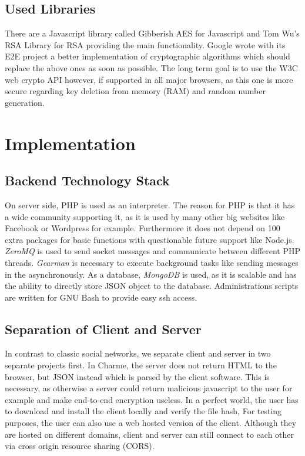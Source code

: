 \documentclass{scrartcl}
\begin{document}
\subsection{Used Libraries}
There are a Javascript library called Gibberish AES for Javascript and Tom Wu's RSA Library for RSA providing the main functionality. Google wrote with its E2E project a better implementation of cryptographic algorithms which should replace the above ones as soon as possible. The long term goal is to use the W3C web crypto API however, if supported in all major browsers, as this one is more secure regarding key deletion from memory (RAM) and random number generation. 

\newpage
\section{Implementation}
\subsection{Backend Technology Stack}
On server side, PHP is used as an interpreter. The reason for PHP is that it has a wide community supporting it, as it is used by many other big websites like Facebook or Wordpress for example. Furthermore it does not depend on 100 extra packages for basic functions with questionable future support like Node.js.
 \textit{ZeroMQ} is used to send socket messages and communicate between different PHP threads. \textit{Gearman} is necessary to execute background tasks like sending messages in the asynchronously. As a database, \textit{MongoDB} is used, as it is scalable and has the ability to directly store JSON object to the database.
Administrations scripts are written for GNU Bash to provide easy ssh access.


 \subsection{Separation of Client and Server}
In contrast to classic social networks, we separate client and server in two separate projects first. In Charme, the server does not return HTML to the browser, but JSON instead which is parsed by the client software. This is necessary, as otherwise a server could return malicious javascript to the user for example and make end-to-end encryption useless. In a perfect world, the user has to download and install the client locally and verify the file hash, For testing purposes, the user can also use a web hosted version of the client. Although they are hosted on different domains, client and server can still connect to each other via cross origin resource sharing (CORS).
\end{document}
